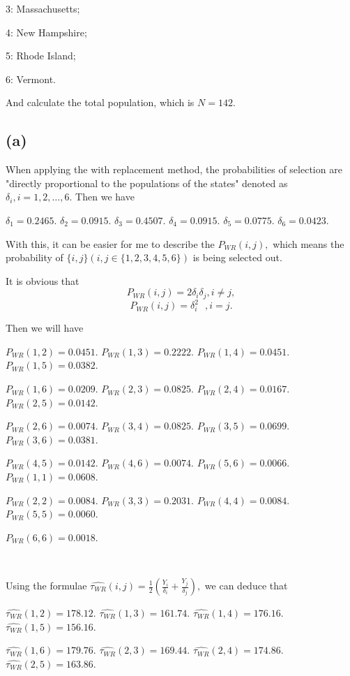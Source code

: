 \documentclass[12pt]{article}%
\begin{document}
3: Massachusetts; 

4: New Hampshire; 

5: Rhode Island; 

6: Vermont.

And calculate the total population, which is $N=142.$

\subsection{(a)}

When applying the with replacement method, the probabilities of 
selection are "directly proportional to the populations of the states"
denoted as $\delta_i, i=1,2,\dots,6.$ Then we have 

$\delta_1 = 0.2465.$ $\delta_2 = 0.0915.$ $\delta_3 = 0.4507.$
$\delta_4 = 0.0915.$ $\delta_5 = 0.0775.$ $\delta_6 = 0.0423.$

With this, it can be easier for me to describe the $P_{WR}(i,j),$ 
which means the probability of $\{i,j\} (i,j \in \{1,2,3,4,5,6\})$
is being selected out. 

It is obvious that 
$$P_{WR}(i,j)=2\delta_i \delta_j, i\neq j,$$
$$P_{WR}(i,j)=\delta_i^2~~~, i = j.$$

Then we will have 

$P_{WR}(1,2)=0.0451.$ $P_{WR}(1,3)=0.2222.$ 
$P_{WR}(1,4)=0.0451.$ $P_{WR}(1,5)=0.0382.$

$P_{WR}(1,6)=0.0209.$ $P_{WR}(2,3)=0.0825.$
$P_{WR}(2,4)=0.0167.$ $P_{WR}(2,5)=0.0142.$

$P_{WR}(2,6)=0.0074.$ $P_{WR}(3,4)=0.0825.$
$P_{WR}(3,5)=0.0699.$ $P_{WR}(3,6)=0.0381.$

$P_{WR}(4,5)=0.0142.$ $P_{WR}(4,6)=0.0074.$
$P_{WR}(5,6)=0.0066.$ $P_{WR}(1,1)=0.0608.$

$P_{WR}(2,2)=0.0084.$ $P_{WR}(3,3)=0.2031.$
$P_{WR}(4,4)=0.0084.$ $P_{WR}(5,5)=0.0060.$

$P_{WR}(6,6)=0.0018.$

~\ 

Using the formulae 
$\widehat{\tau_{WR}}(i,j)=\frac{1}{2}(\frac{Y_i}{\delta_i}+\frac{Y_j}{\delta_j}),$
we can deduce that 

$\widehat{\tau_{WR}}(1,2)=178.12.$ 
$\widehat{\tau_{WR}}(1,3)=161.74.$
$\widehat{\tau_{WR}}(1,4)=176.16.$
$\widehat{\tau_{WR}}(1,5)=156.16.$

$\widehat{\tau_{WR}}(1,6)=179.76.$
$\widehat{\tau_{WR}}(2,3)=169.44.$
$\widehat{\tau_{WR}}(2,4)=174.86.$
$\widehat{\tau_{WR}}(2,5)=163.86.$
\end{document}
